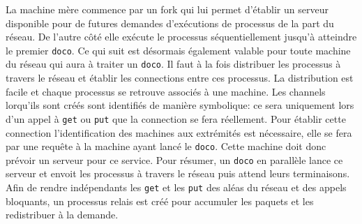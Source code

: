 \documentclass[a4paper]{article}
\begin{document}
La machine mère commence par un fork qui lui permet d'établir un serveur
disponible pour de futures demandes d'exécutions de processus de la part du
réseau. De l'autre côté elle exécute le processus séquentiellement jusqu'à
atteindre le premier \verb!doco!.
Ce qui suit est désormais également valable pour toute machine du réseau
qui aura à traiter un \verb!doco!.
Il faut à la fois distribuer les processus à travers le réseau et établir
les connections entre ces processus. La distribution est facile et chaque
processus se retrouve associés à une machine. Les channels lorqu'ils sont
créés sont identifiés de manière symbolique: ce sera uniquement lors d'un
appel à \verb!get! ou \verb!put! que la connection se fera réellement.
Pour établir cette connection l'identification des machines aux extrémités
est nécessaire, elle se fera par une requête à la machine ayant lancé le
\verb!doco!. Cette machine doit donc prévoir un serveur pour ce service.
Pour résumer, un \verb!doco! en parallèle lance ce serveur et envoit les
processus à travers le réseau puis attend leurs terminaisons.
Afin de rendre indépendants les \verb!get! et les \verb!put! des aléas du
réseau et des appels bloquants, un processus relais est créé pour accumuler
les paquets et les redistribuer à la demande.
\end{document}
